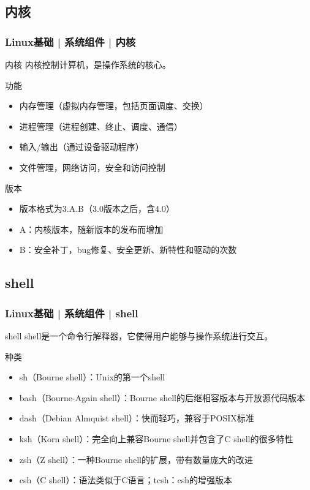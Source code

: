 \subsection{内核}
\begin{frame}
  \frametitle{Linux基础 | 系统组件 | 内核}
  \begin{block}{内核}
    内核控制计算机，是操作系统的核心。
  \end{block}
  \pause
  \begin{block}{功能}
  \begin{itemize}
    \item 内存管理（虚拟内存管理，包括页面调度、交换）
    \item 进程管理（进程创建、终止、调度、通信）
    \item 输入/输出（通过设备驱动程序）
    \item 文件管理，网络访问，安全和访问控制
  \end{itemize}
  \end{block}
  \pause
  \begin{block}{版本}
  \begin{itemize}
    \item 版本格式为3.A.B（3.0版本之后，含4.0）
    \item A：内核版本，随新版本的发布而增加
    \item B：安全补丁，bug修复、安全更新、新特性和驱动的次数
  \end{itemize}
  \end{block}
\end{frame}

\subsection{shell}
\begin{frame}
  \frametitle{Linux基础 | 系统组件 | shell}
  \begin{block}{shell}
    shell是一个命令行解释器，它使得用户能够与操作系统进行交互。
  \end{block}
  \pause
  \begin{block}{\alert{种类}}
  \begin{itemize}[<+->]
    \item sh（Bourne shell）：Unix的第一个shell
    \item bash（Bourne-Again shell）：Bourne shell的后继相容版本与开放源代码版本
    \item dash（Debian Almquist shell）：快而轻巧，兼容于POSIX标准
    \item ksh（Korn shell）：完全向上兼容Bourne shell并包含了C shell的很多特性
    \item zsh（Z shell）：一种Bourne shell的扩展，带有数量庞大的改进
    \item csh（C shell）：语法类似于C语言；tcsh：csh的增强版本
  \end{itemize}
  \end{block}
\end{frame}


